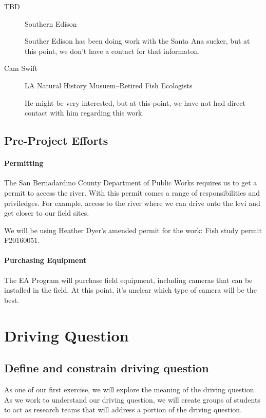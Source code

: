 \documentclass{tufte-handout}\usepackage[]{graphicx}\usepackage[]{color}
\begin{document}
\begin{description}
\item[TBD] Southern Edison

Souther Edison has been doing work with the Santa Ana sucker, but at this point, we don't have a contact for that informaton. 

\item[Cam Swift] LA Natural History Musuem--Retired Fish Ecologists

He might be very interested, but at this point, we have not had direct contact with him regarding this work.

\end{description}


\subsection{Pre-Project Efforts}

\paragraph{Permitting} The San Bernadardino County Department of Public Works requires us to get a permit to access the river. With this permit comes a range of responsibilities and priviledges. For example, access to the river where we can drive onto the levi and get closer to our field sites. 

We will be using Heather Dyer's amended permit for the work: Fish study permit F20160051.

\paragraph{Purchasing Equipment} The EA Program will purchase field equipment, including cameras that can be installed in the field. At this point, it's unclear which type of camera will be the best.


\section{Driving Question}

\subsection{Define and constrain driving question}

As one of our first exercise, we will explore the meaning of the driving question. As we work to understand our driving question, we will create groups of students to act as research teams that will address a portion of the driving question.
\end{document}
